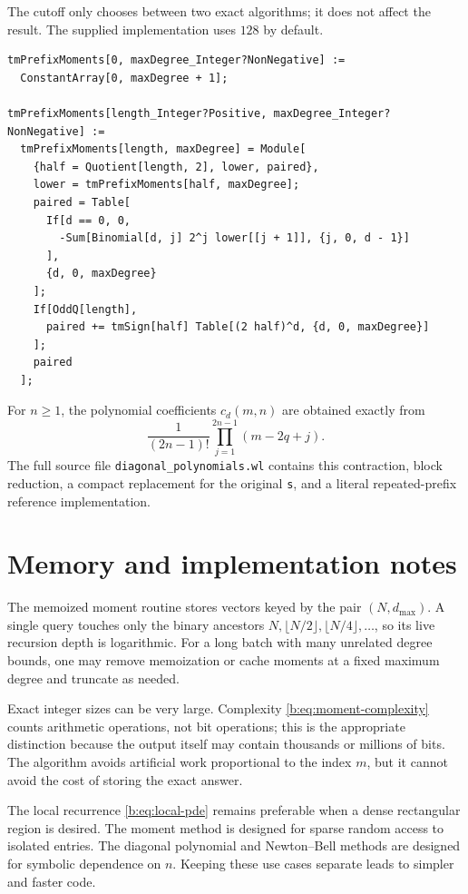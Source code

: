 \documentclass[11pt,a4paper,oneside,openany]{book}
\numberwithin{equation}{chapter}
\theoremstyle{definition}
\theoremstyle{remark}
\begin{document}
The cutoff only chooses between two exact algorithms; it does not affect the
result.  The supplied implementation uses $128$ by default.

\begin{lstlisting}[style=code,language=Wolfram]
tmPrefixMoments[0, maxDegree_Integer?NonNegative] :=
  ConstantArray[0, maxDegree + 1];

tmPrefixMoments[length_Integer?Positive, maxDegree_Integer?NonNegative] :=
  tmPrefixMoments[length, maxDegree] = Module[
    {half = Quotient[length, 2], lower, paired},
    lower = tmPrefixMoments[half, maxDegree];
    paired = Table[
      If[d == 0, 0,
        -Sum[Binomial[d, j] 2^j lower[[j + 1]], {j, 0, d - 1}]
      ],
      {d, 0, maxDegree}
    ];
    If[OddQ[length],
      paired += tmSign[half] Table[(2 half)^d, {d, 0, maxDegree}]
    ];
    paired
  ];
\end{lstlisting}

For $n\ge1$, the polynomial coefficients $c_d(m,n)$ are obtained exactly
from
\[
 \frac{1}{(2n-1)!}\prod_{j=1}^{2n-1}(m-2q+j).
\]
The full source file \texttt{diagonal\_polynomials.wl} contains this
contraction, block reduction, a compact replacement for the original
\texttt{s}, and a literal repeated-prefix reference implementation.

\section{Memory and implementation notes}

The memoized moment routine stores vectors keyed by the pair
$(N,d_{\max})$.  A single query touches only the binary ancestors
$N,\lfloor N/2\rfloor,\lfloor N/4\rfloor,\ldots$, so its live recursion
depth is logarithmic.  For a long batch with many unrelated degree bounds,
one may remove memoization or cache moments at a fixed maximum degree and
truncate as needed.

Exact integer sizes can be very large.  Complexity
\eqref{b:eq:moment-complexity} counts arithmetic operations, not bit
operations; this is the appropriate distinction because the output itself
may contain thousands or millions of bits.  The algorithm avoids artificial
work proportional to the index $m$, but it cannot avoid the cost of storing
the exact answer.

The local recurrence \eqref{b:eq:local-pde} remains preferable when a dense
rectangular region is desired.  The moment method is designed for sparse
random access to isolated entries.  The diagonal polynomial and Newton--Bell
methods are designed for symbolic dependence on $n$.  Keeping these use cases
separate leads to simpler and faster code.
\end{document}
